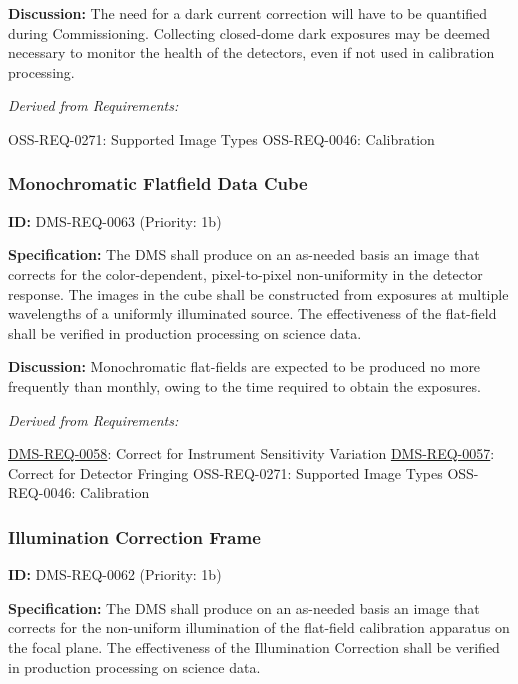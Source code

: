 \documentclass[SE,toc,lsstdraft]{lsstdoc}
\begin{document}
\textbf{Discussion: }The need for a dark current correction will have to be quantified during Commissioning. Collecting closed-dome dark exposures may be deemed necessary to monitor the health of the detectors, even if not used in calibration processing.

\emph{Derived from Requirements:}

OSS-REQ-0271:
Supported Image Types \newline
OSS-REQ-0046:
Calibration \newline

\subsubsection{Monochromatic Flatfield Data Cube}

\label{DMS-REQ-0063}
\textbf{ID:} DMS-REQ-0063 (Priority: 1b)

\textbf{Specification:} The DMS shall produce on an as-needed basis an image that corrects for the color-dependent, pixel-to-pixel non-uniformity in the detector response. The images in the cube shall be constructed from exposures at multiple wavelengths of a uniformly illuminated source. The effectiveness of the flat-field shall be verified in production processing on science data.

\textbf{Discussion:} Monochromatic flat-fields are expected to be produced no more frequently than monthly, owing to the time required to obtain the exposures.

\emph{Derived from Requirements:}

\hyperref[DMS-REQ-0058]{DMS-REQ-0058}:
Correct for Instrument Sensitivity Variation \newline
\hyperref[DMS-REQ-0057]{DMS-REQ-0057}:
Correct for Detector Fringing \newline
OSS-REQ-0271:
Supported Image Types \newline
OSS-REQ-0046:
Calibration \newline

\subsubsection{Illumination Correction Frame}

\label{DMS-REQ-0062}
\textbf{ID:} DMS-REQ-0062 (Priority: 1b)

\textbf{Specification:} The DMS shall produce on an as-needed basis an image that corrects for the non-uniform illumination of the flat-field calibration apparatus on the focal plane. The effectiveness of the Illumination Correction shall be verified in production processing on science data.
\end{document}
